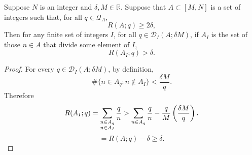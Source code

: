 \begin{lemma}\label{lem:good_d}
\leanok
{}
 Suppose $N$ is an integer and $\delta,M\in \mathbb{R}$. Suppose that $A\subset [M,N]$ is a set of integers such that, for all $q\in \mathcal{Q}_A$,
\[R(A;q) \geq 2\delta,\]
Then for any finite set of integers $I$, for all $q\in\mathcal{D}_I(A;\delta M)$, if $A_I$ is the set of those $n\in A$ that divide some element of $I$,
\[R(A_I;q)> \delta.\]
\end{lemma}
\begin{proof}
  \leanok
For every $q\in \mathcal{D}_I(A;\delta M)$, by definition,
\[\#\{ n\in A_q : n\not\in A_I\} < \frac{\delta M}{q}.\]
Therefore
\[R(A_I;q) = \sum_{\substack{n \in A_q\\n\in A_I}}\frac{q}{n}> \sum_{n \in A_q}\frac{q}{n}-\frac{q}{M}\left( \frac{\delta M}{q}\right).\]
  \[=R(A;q) - \delta \geq \delta.\]
\end{proof}


